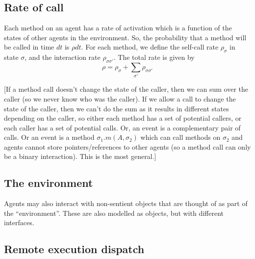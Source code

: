 \documentclass[a4paper]{article}
\begin{document}
\subsection{Rate of call}

Each method on an agent has a rate of activation which is a function of the states of other agents in the environment. So, the probability that a method will be called in time $dt$ is $\rho dt$. For each method, we define the self-call rate $\rho_\sigma$ in state $\sigma$, and the interaction rate $\rho_{\sigma \sigma'}$. The total rate is given by
\[
\rho = \rho_\sigma + \sum_{\sigma'} \rho_{\sigma\sigma'}
\]

[If a method call doesn't change the state of the caller, then we can sum over the caller (so we never know who was the caller). If we allow a call to change the state of the caller, then we can't do the sum as it results in different states depending on the caller, so either each method has a set of potential callers, or each caller has a set of potential calls. Or, an event is a complementary pair of calls. Or an event is a method $\sigma_1.m(A, \sigma_2)$ which can call methods on $\sigma_2$ and agents cannot store pointers/references to other agents (so a method call can only be a binary interaction). This is the most general.]


\subsection{The environment}

Agents may also interact with non-sentient objects that are thought of as part of the ``environment''. These are also modelled as objects, but with different interfaces. 

\subsection{Remote execution dispatch}
\end{document}
